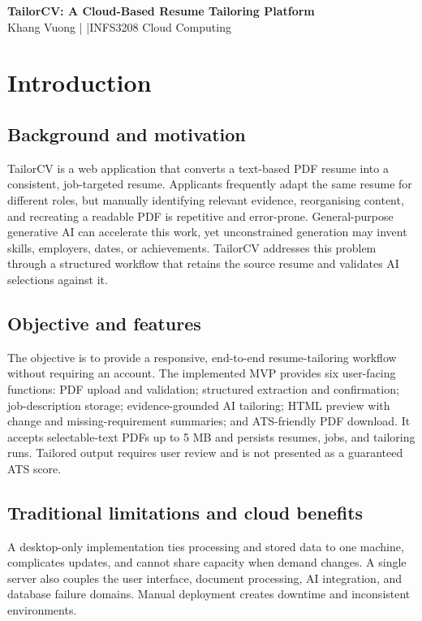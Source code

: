 \documentclass[10pt,a4paper]{article}
\begin{document}
\begin{center}
  {\LARGE\bfseries\color{ink} TailorCV: A Cloud-Based Resume Tailoring Platform}\\[-1pt]
  {\small Khang Vuong \quad| \quad|\quad INFS3208 Cloud Computing}
\end{center}

\section{Introduction}

\subsection{Background and motivation}
TailorCV is a web application that converts a text-based PDF resume into a consistent, job-targeted resume. Applicants frequently adapt the same resume for different roles, but manually identifying relevant evidence, reorganising content, and recreating a readable PDF is repetitive and error-prone. General-purpose generative AI can accelerate this work, yet unconstrained generation may invent skills, employers, dates, or achievements. TailorCV addresses this problem through a structured workflow that retains the source resume and validates AI selections against it.

\subsection{Objective and features}
The objective is to provide a responsive, end-to-end resume-tailoring workflow without requiring an account. The implemented MVP provides six user-facing functions: PDF upload and validation; structured extraction and confirmation; job-description storage; evidence-grounded AI tailoring; HTML preview with change and missing-requirement summaries; and ATS-friendly PDF download. It accepts selectable-text PDFs up to 5 MB and persists resumes, jobs, and tailoring runs. Tailored output requires user review and is not presented as a guaranteed ATS score.

\subsection{Traditional limitations and cloud benefits}
A desktop-only implementation ties processing and stored data to one machine, complicates updates, and cannot share capacity when demand changes. A single server also couples the user interface, document processing, AI integration, and database failure domains. Manual deployment creates downtime and inconsistent environments.
\end{document}
